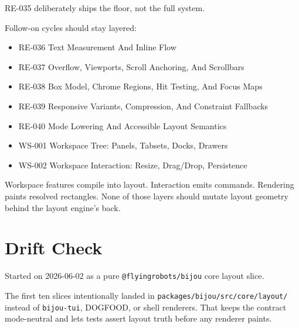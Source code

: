 RE-035 deliberately ships the floor, not the full system.

Follow-on cycles should stay layered:

\begin{itemize}
\tightlist
\item
  RE-036 Text Measurement And Inline Flow
\item
  RE-037 Overflow, Viewports, Scroll Anchoring, And Scrollbars
\item
  RE-038 Box Model, Chrome Regions, Hit Testing, And Focus Maps
\item
  RE-039 Responsive Variants, Compression, And Constraint Fallbacks
\item
  RE-040 Mode Lowering And Accessible Layout Semantics
\item
  WS-001 Workspace Tree: Panels, Tabsets, Docks, Drawers
\item
  WS-002 Workspace Interaction: Resize, Drag/Drop, Persistence
\end{itemize}

Workspace features compile into layout. Interaction emits commands. Rendering paints resolved rectangles. None of those layers should mutate layout geometry behind the layout engine's back.

\section{Drift Check}\label{record-163-drift-check}

Started on 2026-06-02 as a pure \texttt{@\allowbreak{}f\allowbreak{}l\allowbreak{}y\allowbreak{}i\allowbreak{}n\allowbreak{}g\allowbreak{}r\allowbreak{}o\allowbreak{}b\allowbreak{}o\allowbreak{}t\allowbreak{}s\allowbreak{}/\allowbreak{}b\allowbreak{}i\allowbreak{}j\allowbreak{}o\allowbreak{}u} core layout slice.

The first ten slices intentionally landed in \texttt{p\allowbreak{}a\allowbreak{}c\allowbreak{}k\allowbreak{}a\allowbreak{}g\allowbreak{}e\allowbreak{}s\allowbreak{}/\allowbreak{}b\allowbreak{}i\allowbreak{}j\allowbreak{}o\allowbreak{}u\allowbreak{}/\allowbreak{}s\allowbreak{}r\allowbreak{}c\allowbreak{}/\allowbreak{}c\allowbreak{}o\allowbreak{}r\allowbreak{}e\allowbreak{}/\allowbreak{}l\allowbreak{}a\allowbreak{}y\allowbreak{}o\allowbreak{}u\allowbreak{}t\allowbreak{}/} instead of \texttt{b\allowbreak{}i\allowbreak{}j\allowbreak{}o\allowbreak{}u\allowbreak{}-\allowbreak{}t\allowbreak{}u\allowbreak{}i}, DOGFOOD, or shell renderers. That keeps the contract mode-neutral and lets tests assert layout truth before any renderer paints.


